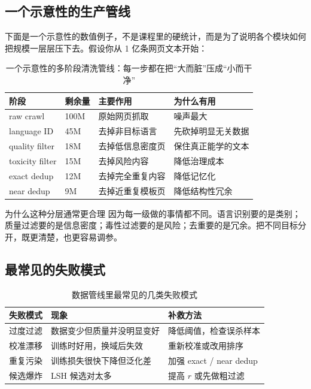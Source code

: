 \documentclass[a4paper]{article}
\begin{document}
\subsection{一个示意性的生产管线}

下面是一个示意性的数值例子，不是课程里的硬统计，而是为了说明各个模块如何把规模一层层压下去。假设你从 1 亿条网页文本开始：

\begin{table}[H]
\centering
\small
\renewcommand{\arraystretch}{1.15}
\begin{tabular}{p{3.0cm}p{2.8cm}p{4.5cm}p{2.7cm}}
\toprule
\textbf{阶段} & \textbf{剩余量} & \textbf{主要作用} & \textbf{为什么有用} \\
\midrule
raw crawl & 100M & 原始网页抓取 & 噪声最大 \\
language ID & 45M & 去掉非目标语言 & 先砍掉明显无关数据 \\
quality filter & 18M & 去掉低信息密度页 & 保住真正能学的文本 \\
toxicity filter & 15M & 去掉风险内容 & 降低治理成本 \\
exact dedup & 12M & 去掉完全重复内容 & 降低记忆化 \\
near dedup & 9M & 去掉近重复模板页 & 降低结构性冗余 \\
\bottomrule
\end{tabular}
\caption{一个示意性的多阶段清洗管线：每一步都在把“大而脏”压成“小而干净”}
\end{table}

\begin{importantbox}{为什么这种分层通常更合理}
因为每一级做的事情都不同。语言识别要的是类别；质量过滤要的是信息密度；毒性过滤要的是风险；去重要的是冗余。把不同目标分开，既更清楚，也更容易调参。
\end{importantbox}

\subsection{最常见的失败模式}

\begin{table}[H]
\centering
\small
\renewcommand{\arraystretch}{1.15}
\begin{tabular}{p{3.0cm}p{4.2cm}p{4.0cm}}
\toprule
\textbf{失败模式} & \textbf{现象} & \textbf{补救方法} \\
\midrule
过度过滤 & 数据变少但质量并没明显变好 & 降低阈值，检查误杀样本 \\
校准漂移 & 训练时好用，换域后失效 & 重新校准或改用排序 \\
重复污染 & 训练损失很快下降但泛化差 & 加强 exact / near dedup \\
候选爆炸 & LSH 候选对太多 & 提高 $r$ 或先做粗过滤 \\
\bottomrule
\end{tabular}
\caption{数据管线里最常见的几类失败模式}
\end{table}
\end{document}
